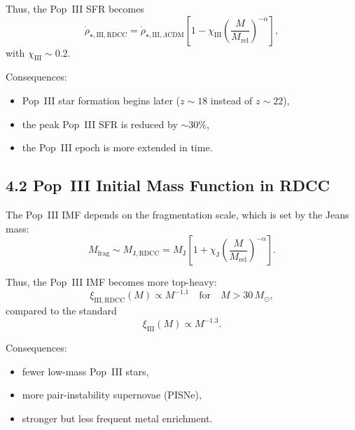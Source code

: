 \documentclass[11pt,a4paper]{article}
\begin{document}
Thus, the Pop~III SFR becomes
\begin{equation}
    \dot{\rho}_{\star,\mathrm{III,RDCC}}
    = \dot{\rho}_{\star,\mathrm{III},\Lambda\mathrm{CDM}}
      \left[
        1 - \chi_{\mathrm{III}}
        \left(\frac{M}{M_{\mathrm{rel}}}\right)^{-\alpha}
      \right],
\end{equation}
with $\chi_{\mathrm{III}} \sim 0.2$.

Consequences:

\begin{itemize}
    \item Pop~III star formation begins later ($z \sim 18$ instead of $z \sim 22$),
    \item the peak Pop~III SFR is reduced by $\sim 30\%$,
    \item the Pop~III epoch is more extended in time.
\end{itemize}

\subsection*{4.2 Pop~III Initial Mass Function in RDCC}

The Pop~III IMF depends on the fragmentation scale, which is set by the Jeans mass:
\begin{equation}
    M_{\mathrm{frag}}
    \sim M_{\mathrm{J,RDCC}}
    = M_{\mathrm{J}}
      \left[
        1 + \chi_{\mathrm{J}}
        \left(\frac{M}{M_{\mathrm{rel}}}\right)^{-\alpha}
      \right].
\end{equation}

Thus, the Pop~III IMF becomes more top-heavy:
\begin{equation}
    \xi_{\mathrm{III,RDCC}}(M)
    \propto M^{-1.1}
    \quad \text{for} \quad M > 30\,M_{\odot},
\end{equation}
compared to the standard
\begin{equation}
    \xi_{\mathrm{III}}(M)
    \propto M^{-1.3}.
\end{equation}

Consequences:

\begin{itemize}
    \item fewer low-mass Pop~III stars,
    \item more pair-instability supernovae (PISNe),
    \item stronger but less frequent metal enrichment.
\end{itemize}
\end{document}
